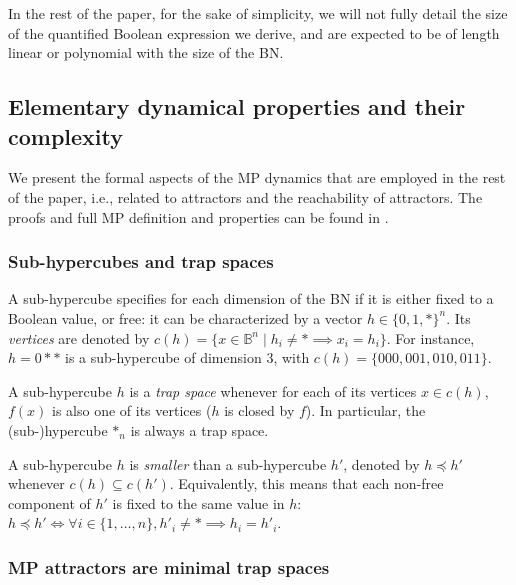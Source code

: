 \documentclass[PCJ,Unicode,screen,mode=plain]{cedram}
\begin{document}
In the rest of the paper, for the sake of simplicity, we will not fully
detail the size of the quantified Boolean expression we derive, and are
expected to be of length linear or polynomial with the size of the BN.
\hypertarget{elementary-dynamical-properties-and-their-complexity}{%
\subsection{Elementary dynamical properties and their
complexity}\label{elementary-dynamical-properties-and-their-complexity}}

We present the formal aspects of the MP dynamics that are employed in
the rest of the paper, i.e., related to attractors and the reachability
of attractors. The proofs and full MP definition and properties can be
found in \citep{Pauleve2020}.

\hypertarget{sub-hypercubes-and-trap-spaces}{%
\subsubsection{Sub-hypercubes and trap
spaces}\label{sub-hypercubes-and-trap-spaces}}

A sub-hypercube specifies for each dimension of the BN if it is either
fixed to a Boolean value, or free: it can be characterized by a vector
\(h\in \{0,1,*\}^n\). Its \emph{vertices} are denoted by
\(c(h) = \{ x\in \mathbb B^n\mid h_i\neq *\implies x_i=h_i\}\). For
instance, \(h=0**\) is a sub-hypercube of dimension 3, with
\(c(h) = \{000, 001, 010, 011\}\).

A sub-hypercube \(h\) is a \emph{trap space} whenever for each of its
vertices \(x\in c(h)\), \(f(x)\) is also one of its vertices (\(h\) is
closed by \(f\)). In particular, the (sub-)hypercube \(\mathbf *_n\) is
always a trap space.

A sub-hypercube \(h\) is \emph{smaller} than a sub-hypercube \(h'\),
denoted by \(h \preceq h'\) whenever \(c(h)\subseteq c(h')\).
Equivalently, this means that each non-free component of \(h'\) is fixed
to the same value in \(h\):
\(h \preceq h' \iff \forall i\in \{1,\ldots,n\}, h'_i\neq *\implies h_i=h'_i\).

\hypertarget{mp-attractors-are-minimal-trap-spaces}{%
\subsubsection{MP attractors are minimal trap
spaces}\label{mp-attractors-are-minimal-trap-spaces}}
\end{document}
